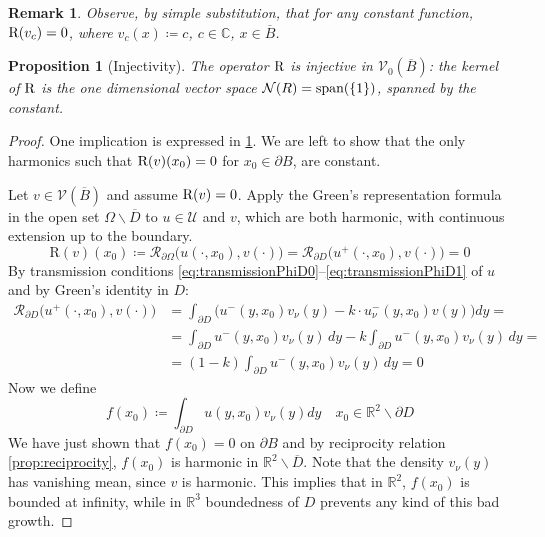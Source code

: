 \documentclass[10pt, a4paper, twoside, openright]{book}
\theoremstyle{definition}
\theoremstyle{plain}
\theoremstyle{plain}
\theoremstyle{plain}
\newtheorem{proposition}[subsection]{Proposition}
\theoremstyle{plain}
\newtheorem{remark}[subsection]{Remark}
\theoremstyle{plain}
\theoremstyle{plain}
\theoremstyle{plain}
\theoremstyle{plain}
\begin{document}
\begin{remark}
 \label{rem:kernel-R}
 Observe, by simple substitution, that for any constant function, $\textup{R}(v_c)=0$, where $v_c(x)\coloneqq c$, $c\in\mathbb{C}$, $x\in\overline{B}$.
\end{remark}
\begin{proposition}[Injectivity]
\label{prop:injectivity}
 The operator $\textup{R}$ is injective in $\mathcal{V}_0(\overline{B})$: the kernel of $\textup{R}$ is the one dimensional vector space $\mathcal{N}(R)=\textup{span}(\{1\})$, spanned by the constant.
\end{proposition}
\begin{proof}
\label{proof:injectivity}
One implication is expressed in \ref{rem:kernel-R}. We are left to show that the only harmonics such that $\textup{R}(v)(x_0)=0$ for $x_0\in\partial B$, are constant.
\par
Let $v\in\mathcal{V}(\overline{B})$ and assume $\textup{R}(v)=0$. Apply the Green's representation formula in the open set $\Omega\backslash\overline{D}$ to $u\in\mathcal{U}$ and $v$, which are both harmonic, with continuous extension up to the boundary.
\begin{equation}
  \text{R}(v)(x_0)\coloneqq\mathcal{R}_{\partial\Omega}\bigl(u(\cdot,x_0),v(\cdot)\bigr) = \mathcal{R}_{\partial D}\bigl(u^+(\cdot,x_0),v(\cdot)\bigr) = 0
 \end{equation}
 By transmission conditions \eqref{eq:transmissionPhiD0}--\eqref{eq:transmissionPhiD1} of $u$ and by Green's identity in $D$:
 \begin{align*}
  \mathcal{R}_{\partial D}\bigl(u^+(\cdot,x_0),v(\cdot)\bigr) &= \int_{\partial D}\bigl(u^-(y,x_0)v_\nu (y) - k \cdot u^-_\nu(y,x_0)v(y)\bigr)dy = \\
  &= \int_{\partial D}u^-(y,x_0)v_\nu (y)\,dy - k\int_{\partial D}u^-(y,x_0)v_\nu (y)\,dy = \\
  &= (1-k)\int_{\partial D}u^-(y,x_0)v_\nu (y)\,dy = 0
 \end{align*}
 Now we define
 \begin{equation}
  f(x_0)\coloneqq \int_{\partial D} u(y,x_0)v_\nu(y)dy\quad x_0 \in \mathbb{R}^2\backslash\partial D
 \end{equation}
 We have just shown that $f(x_0)=0$ on $\partial B$ and 
 by reciprocity relation \ref{prop:reciprocity}, $f(x_0)$ is harmonic in $\mathbb{R}^2\backslash\overline{D}$.
 Note that the density $v_\nu(y)$ has vanishing mean, since $v$ is harmonic. This implies that in $\mathbb{R}^2$, $f(x_0)$ is bounded at infinity, while in $\mathbb{R}^3$ boundedness of $D$ prevents any kind of this bad growth.

\end{proof}
\end{document}
